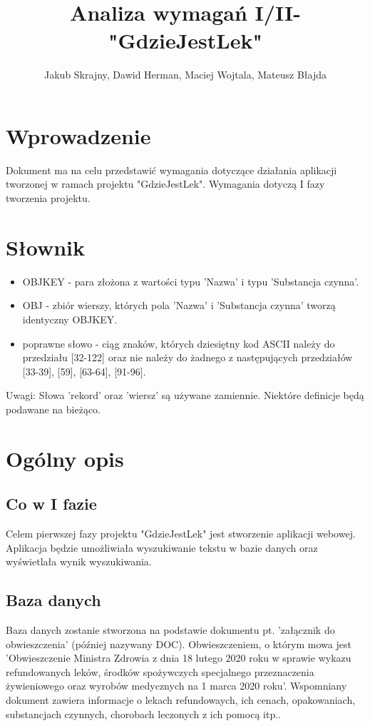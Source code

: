 \documentclass[10pt, a4paper]{article}
\author{Jakub Skrajny, Dawid Herman, Maciej Wojtala, Mateusz Błajda}
\title{Analiza wymagań I/II- "GdzieJestLek"}
\begin{document}
\maketitle
\section{Wprowadzenie}
 Dokument ma na celu przedstawić wymagania dotyczące działania aplikacji tworzonej w ramach projektu "GdzieJestLek". Wymagania dotyczą I fazy tworzenia projektu.
\section{Słownik}
\begin{itemize}
\item OBJKEY - para złożona z wartości typu 'Nazwa' i typu 'Substancja czynna'.
\item OBJ - zbiór wierszy, których pola 'Nazwa' i 'Substancja czynna' tworzą identyczny OBJKEY.
\item poprawne słowo - ciąg znaków, których dziesiętny kod ASCII należy do przedziału [32-122] oraz nie należy do żadnego z następujących przedziałów [33-39], [59], [63-64], [91-96].
\end{itemize}
Uwagi:\newline
Słowa 'rekord' oraz 'wiersz' są używane zamiennie. \newline
Niektóre definicje będą podawane na bieżąco.
\section{Ogólny opis}
\subsection{Co w I fazie}
Celem pierwszej fazy projektu "GdzieJestLek" jest stworzenie aplikacji webowej. Aplikacja będzie umożliwiała wyszukiwanie tekstu w bazie danych oraz wyświetlała wynik wyszukiwania.
\subsection{Baza danych}
Baza danych zostanie stworzona na podstawie dokumentu pt.
'załącznik do obwieszczenia' (później nazywany DOC). Obwieszczeniem, o którym mowa jest 'Obwieszczenie Ministra Zdrowia z dnia 18 lutego 2020 roku w sprawie wykazu refundowanych leków, środków spożywczych specjalnego przeznaczenia żywieniowego oraz wyrobów medycznych na 1 marca 2020 roku'. Wspomniany dokument zawiera informacje o lekach refundowaych, ich cenach, opakowaniach, substancjach czynnych, chorobach leczonych z ich pomocą itp..
\end{document}
